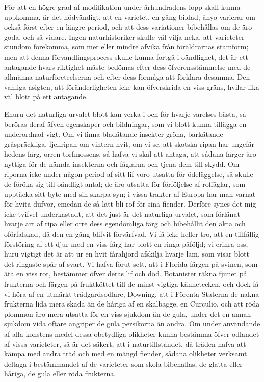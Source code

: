 För att en högre grad af modifikation under århundradens lopp skall kunna uppkomma, är det nödvändigt, att en varietet, en gång bildad, ånyo varierar om också först efter en längre period, och att dess variationer bibehållas om de äro goda, och så vidare. Ingen naturhistoriker skulle väl vilja neka, att varieteter stundom förekomma, som mer eller mindre afvika från föräldrarnas stamform; men att denna förvandlingsprocess skulle kunna fortgå i oändlighet, det är ett antagande hvars riktighet måste bedömas efter dess öfverensstämmelse med de allmänna naturföreteelserna och efter dess förmåga att förklara desamma. Den vanliga åsigten, att föränderligheten icke kan öfverskrida en viss gräns, hvilar lika väl blott på ett antagande.

Ehuru det naturliga urvalet blott kan verka i och för hvarje varelses bästa, så beröras deraf äfven egenskaper och bildningar, som vi blott kunna tillägga en underordnad vigt. Om vi finna bladätande insekter gröna, barkätande gråspräckliga, fjellripan om vintern hvit, om vi se, att skotska ripan har ungefär hedens färg, orren torfmossens, så hafva vi skäl att antaga, att sådana färger äro nyttiga för de nämda insekterna och fåglarna och tjena dem till skydd. Om riporna icke under någon period af sitt lif voro utsatta för ödeläggelse, så skulle de föröka sig till oändligt antal; de äro utsatta för förföljelse af roffåglar, som upptäcka sitt byte med sin skarpa syn; i vissa trakter af Europa har man varnat för hvita dufvor, emedan de så lätt bli rof för sina fiender. Derföre synes det mig icke tvifvel underkastadt, att det just är det naturliga urvalet, som förlänat hvarje art af ripa eller orre dess egendomliga färg och bibehållit den äkta och oförfalskad, då den en gång blifvit förvärfvad. Vi få icke heller tro, att en tillfällig förstöring af ett djur med en viss färg har blott en ringa påföljd; vi erinra oss, huru vigtigt det är att ur en hvit fårahjord afskilja hvarje lam, som visar blott det ringaste spår af svart. Vi hafva förut sett, att i Florida färgen på svinen, som äta en viss rot, bestämmer öfver deras lif och död. Botanister räkna fjunet på frukterna och färgen på fruktköttet till de minst vigtiga kännetecken, och dock få vi höra af en utmärkt trädgårdsodlare, Downing, att i Förenta Staterna de nakna frukterna lida mera skada än de håriga af en skalbagge, en Curculio, och att röda plommon äro mera utsatta för en viss sjukdom än de gula, under det en annan sjukdom vida oftare angriper de gula persikorna än andra. Om under användande af alla konstens medel dessa obetydliga olikheter kunna bestämma öfver odlandet af vissa varieteter, så är det säkert, att i naturtillståndet, då träden hafva att kämpa med andra träd och med en mängd fiender, sådana olikheter verksamt deltaga i bestämmandet af de varieteter som skola bibehållas, de glatta eller håriga, de gula eller röda frukterna.

